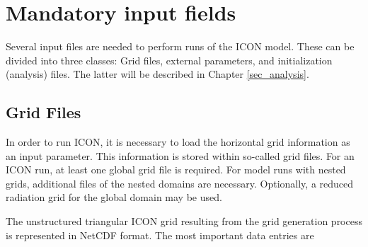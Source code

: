 \chapter{Mandatory input fields}

Several input files are needed to perform runs of the ICON model. 
%
These can be divided into three classes:
%
Grid files, external parameters, and initialization (analysis) files. The latter 
will be described in Chapter \ref{sec_analysis}.


\section{Grid Files}
\label{section:grid_files}




In order to run ICON, it is necessary to load the horizontal grid
information as an input para\-meter. 
This information is stored within so-called grid files. For an ICON 
run, at least one global grid file is required.
For model runs with nested grids, additional files of the nested
domains are necessary. Optionally, a reduced radiation grid for
the global domain may be used.

%
The unstructured triangular ICON grid resulting from the grid
generation process is represented in NetCDF format.  The most
important data entries are

